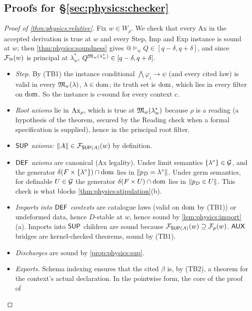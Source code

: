 \subsection{Proofs for \S\ref{sec:physics:checker}}

\begin{proof}[Proof of \cref{thm:physics:relative}]
Fix $w\in W_\rho$. We check that every Ax in the accepted derivation is true at $w$ and every
Step, Imp and Exp instance is sound at $w$; then \cref{thm:physics:soundness} gives
$@\models_w Q\in[q-\delta,q+\delta]$, and since $\mathcal{F}_@(w)$ is principal at $\lambda^*_w$,
$Q^{\mathfrak{M}_w(\lambda^*_w)}\in[q-\delta,q+\delta]$.
\begin{itemize}
\item \emph{Step.} By (TB1) the instance conditional $\bigwedge\varphi_i\to\psi$ (and every
  cited law) is valid in every $\mathfrak{M}_w(\lambda)$, $\lambda\in\operatorname{dom}$; its truth set is $\operatorname{dom}$,
  which lies in every filter on $\operatorname{dom}$. So the instance is $c$-sound for every context $c$.
\item \emph{Root axioms} lie in $\mathrm{Ax}_\rho$, which is true at $\mathfrak{M}_w(\lambda^*_w)$ because
  $\rho$ is a reading (a hypothesis of the theorem, secured by the Reading check when a
  formal specification is supplied), hence in the principal root filter.
\item \emph{$\mathsf{SUP}$ axioms:} $\lVert A\rVert\in\mathcal{F}_{\mathsf{SUP}(A)}(w)$ by definition.
\item \emph{$\mathsf{DEF}$ axioms} are canonical (Ax legality). Under limit semantics
  $\{\lambda^\circ\}\in\mathcal{G}$, and the generator $\delta(F\times\{\lambda^\circ\})\cap\operatorname{dom}$ lies
  in $\lVert p_D=\lambda^\circ\rVert$. Under germ semantics, for definable $U\in\mathcal{G}$ the generator
  $\delta(F\times U)\cap\operatorname{dom}$ lies in $\lVert p_D\in U\rVert$. This check is what blocks
  \cref{thm:physics:stipulation}(b).
\item \emph{Imports into $\mathsf{DEF}$ contexts} are catalogue laws (valid on $\operatorname{dom}$ by (TB1)) or
  undeformed data, hence $D$-stable at $w$, hence sound by \cref{lem:physics:import}(a).
  Imports into $\mathsf{SUP}$ children are sound because $\mathcal{F}_{\mathsf{SUP}(A)}(w)\supseteq\mathcal{F}_p(w)$.
  $\mathsf{AUX}$ bridges are kernel-checked theorems, sound by (TB1).
\item \emph{Discharges} are sound by \cref{prop:physics:sup}.
\item \emph{Exports.} Schema indexing ensures that the cited $\beta$ is, by (TB2), a theorem
  for the context's actual declaration. In the pointwise form, the core of the proof of

\end{itemize}
\end{proof}
